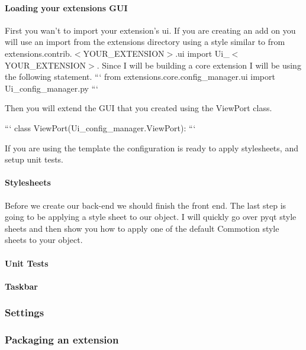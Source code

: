 \paragraph*{Loading your extensions G\+U\+I}

First you wan't to import your extension's ui. If you are creating an add on you will use an import from the extensions directory using a style similar to {\ttfamily from extensions.\+contrib.$<$Y\+O\+U\+R\+\_\+\+E\+X\+T\+E\+N\+S\+I\+O\+N$>$.ui import Ui\+\_\+$<$Y\+O\+U\+R\+\_\+\+E\+X\+T\+E\+N\+S\+I\+O\+N$>$}. Since I will be building a core extension I will be using the following statement. ``` from extensions.\+core.\+config\+\_\+manager.\+ui import Ui\+\_\+config\+\_\+manager.\+py ```

Then you will extend the G\+U\+I that you created using the View\+Port class.

``` class View\+Port(Ui\+\_\+config\+\_\+manager.\+View\+Port)\+: ```

If you are using the template the configuration is ready to apply stylesheets, and setup unit tests.

\paragraph*{Stylesheets}

Before we create our back-\/end we should finish the front end. The last step is going to be applying a style sheet to our object. I will quickly go over pyqt style sheets and then show you how to apply one of the default Commotion style sheets to your object.

\paragraph*{Unit Tests}

\paragraph*{Taskbar}

\subsubsection*{Settings}

\subsubsection*{Packaging an extension}